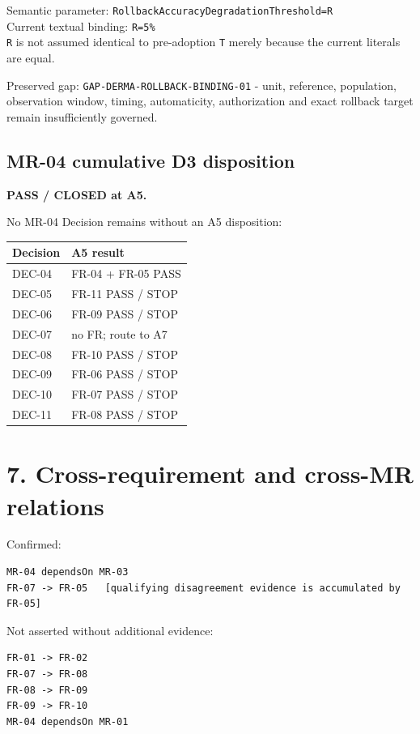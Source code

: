 \documentclass[11pt,a4paper]{article}
\begin{document}
Semantic parameter: \texttt{RollbackAccuracyDegradationThreshold=R}\\
Current textual binding: \texttt{R=5\%}\\
\texttt{R} is not assumed identical to pre-adoption \texttt{T} merely
because the current literals are equal.

Preserved gap: \texttt{GAP-DERMA-ROLLBACK-BINDING-01} - unit, reference,
population, observation window, timing, automaticity, authorization and
exact rollback target remain insufficiently governed.

\subsection{MR-04 cumulative D3
disposition}\label{mr-04-cumulative-d3-disposition}

\textbf{PASS / CLOSED at A5.}

No MR-04 Decision remains without an A5 disposition:

\begin{longtable}[]{@{}ll@{}}
\toprule\noalign{}
Decision & A5 result \\
\midrule\noalign{}
\endhead
\bottomrule\noalign{}
\endlastfoot
DEC-04 & FR-04 + FR-05 PASS \\
DEC-05 & FR-11 PASS / STOP \\
DEC-06 & FR-09 PASS / STOP \\
DEC-07 & no FR; route to A7 \\
DEC-08 & FR-10 PASS / STOP \\
DEC-09 & FR-06 PASS / STOP \\
DEC-10 & FR-07 PASS / STOP \\
DEC-11 & FR-08 PASS / STOP \\
\end{longtable}

\section{7. Cross-requirement and cross-MR
relations}\label{7-cross-requirement-and-cross-mr-relations}

Confirmed:

\begin{verbatim}
MR-04 dependsOn MR-03
FR-07 -> FR-05   [qualifying disagreement evidence is accumulated by FR-05]
\end{verbatim}

Not asserted without additional evidence:

\begin{verbatim}
FR-01 -> FR-02
FR-07 -> FR-08
FR-08 -> FR-09
FR-09 -> FR-10
MR-04 dependsOn MR-01
\end{verbatim}
\end{document}
